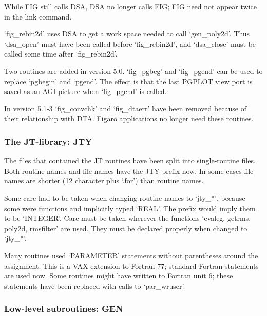 \documentclass[11pt,twoside]{article}
\begin{document}
   While FIG still calls DSA, DSA no longer calls FIG; FIG need not
   appear twice in the link command.

   `fig\_rebin2d' uses DSA to get a work space needed to call
   `gen\_poly2d'.  Thus `dsa\_open' must have been called before
   `fig\_rebin2d', and `dsa\_close' must be called some time after
   `fig\_rebin2d'.

   Two routines are added in version 5.0. `fig\_pgbeg' and `fig\_pgend'
   can be used to replace `pgbegin' and `pgend'. The effect is that the
   last PGPLOT view port is saved as an AGI picture when `fig\_pgend' is
   called.

   In version 5.1-3 `fig\_convchk' and `fig\_dtaerr' have been removed
   because of their relationship with DTA. Figaro applications no
   longer need these routines.


\subsubsection{\label{changessub8}The JT-library: JTY}

   The files that contained the JT routines have been split into
   single-routine files. Both routine names and file names have the JTY
   prefix now. In some cases file names are shorter (12 character plus
   `.for') than routine names.

   Some care had to be taken when changing routine names to `jty\_*',
   because some were functions and implicitly typed `REAL'. The prefix
   would imply them to be `INTEGER'. Care must be taken wherever the
   functions `evaleg, getrms, poly2d, rmsfilter' are used. They must be
   declared properly when changed to `jty\_*'.

   Many routines used `PARAMETER' statements without parentheses around the
   assignment.  This is a VAX extension to Fortran 77; standard Fortran
   statements are used now.  Some routines might have written to Fortran
   unit 6; these statements have been replaced with calls to
   `par\_wruser'.


\subsubsection{\label{changessub9}Low-level subroutines: GEN}
\end{document}
